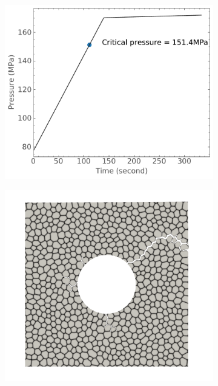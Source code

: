 \begin{figure}[htb!]
\begin{subfigure}[t]{0.32\linewidth}
    \caption{}
  \end{subfigure}\\
  \begin{subfigure}[t]{0.32\linewidth}
    \centering
    \includegraphics[width=\linewidth]{Chapter3/figures/bubble_pressure_r0.5_ext60_rod196}
    \caption{}
  \end{subfigure}
  \begin{subfigure}[t]{0.32\linewidth}
    \centering
    \includegraphics[width=\linewidth]{Chapter3/figures/r5_ext60}

\end{subfigure}
\end{figure}
